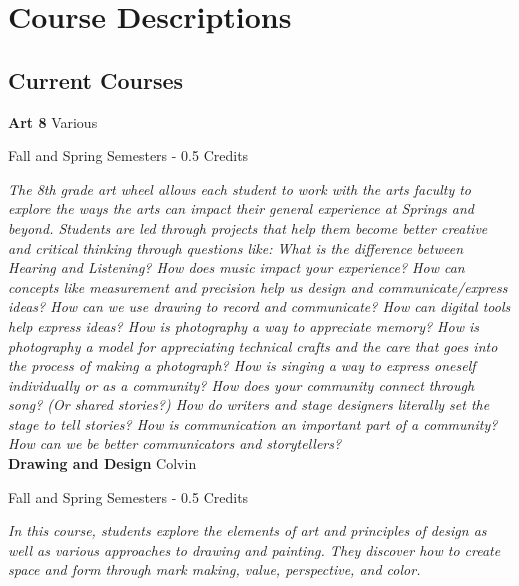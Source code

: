 \section{Course Descriptions}

\subsection{Current Courses}
\noindent\textbf{Art 8} \hfill Various

\noindent Fall and Spring Semesters - 0.5 Credits

\vspace{1mm}\emph{The 8th grade art wheel allows each student to work with the arts faculty to explore the ways the arts can impact their general experience at Springs and beyond. Students are led through projects that help them become better creative and critical thinking through questions like: What is the difference between Hearing and Listening? How does music impact your experience? How can concepts like measurement and precision help us design and communicate/express ideas? How can we use drawing to record and communicate? How can digital tools help express ideas? How is photography a way to appreciate memory? How is photography a model for appreciating technical crafts and the care that goes into the process of making a photograph? How is singing a way to express oneself individually or as a community? How does your community connect through song? (Or shared stories?) How do writers and stage designers literally set the stage to tell stories? How is communication an important part of a community? How can we be better communicators and storytellers?}\\

\noindent\textbf{Drawing and Design} \hfill Colvin

\noindent Fall and Spring Semesters - 0.5 Credits

\vspace{1mm}\emph{In this course, students explore the elements of art and principles of design as well as various approaches to drawing and painting. They discover how to create space and form through mark making, value, perspective, and color.}\\

%
%

